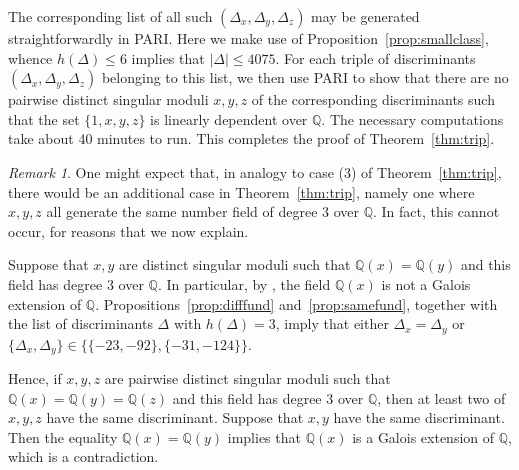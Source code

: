 \documentclass[11pt,a4paper, british]{amsart}
\theoremstyle{definition}
\theoremstyle{remark}
\newtheorem{remark}[thm]{Remark}
\numberwithin{equation}{section}
\newcommand{\Q}{\mathbb{Q}} %
\begin{document}
The corresponding list of all such $(\Delta_x, \Delta_y, \Delta_z)$ may be generated straightforwardly in PARI. Here we make use of Proposition~\ref{prop:smallclass}, whence $h(\Delta) \leq 6$ implies that $\lvert \Delta \rvert \leq 4075$. For each triple of discriminants $(\Delta_x, \Delta_y, \Delta_z)$ belonging to this list, we then use PARI to show that there are no pairwise distinct singular moduli $x, y, z$ of the corresponding discriminants such that the set $\{1, x, y, z\}$ is linearly dependent over $\Q$. The necessary computations take about 40 minutes to run. This completes the proof of Theorem~\ref{thm:trip}. 

\begin{remark}\label{rmk:deg3}
	One might expect that, in analogy to case (3) of Theorem~\ref{thm:trip}, there would be an additional case in Theorem~\ref{thm:trip}, namely one where $x, y, z$ all generate the same number field of degree $3$ over $\Q$. In fact, this cannot occur, for reasons that we now explain.
	
	Suppose that $x, y$ are distinct singular moduli such that $\Q(x) = \Q(y)$ and this field has degree $3$ over $\Q$. In particular, by \cite[Corollary~3.3]{AllombertBiluMadariaga15}, the field $\Q(x)$ is not a Galois extension of $\Q$. Propositions~\ref{prop:difffund} and~\ref{prop:samefund}, together with the list of discriminants $\Delta$ with  $h(\Delta) = 3$, imply that either $\Delta_x = \Delta_y$ or $\{\Delta_x, \Delta_y\} \in \{ \{-23, -92\}, \{-31, -124\} \}$. 
	
	Hence, if $x, y, z$ are pairwise distinct singular moduli such that $\Q(x) = \Q(y) = \Q(z)$ and this field has degree $3$ over $\Q$, then at least two of $x, y, z$ have the same discriminant. Suppose that $x, y$ have the same discriminant. Then the equality $\Q(x) = \Q(y)$ implies that $\Q(x)$ is a Galois extension of $\Q$, which is a contradiction.
\end{remark}
\end{document}
